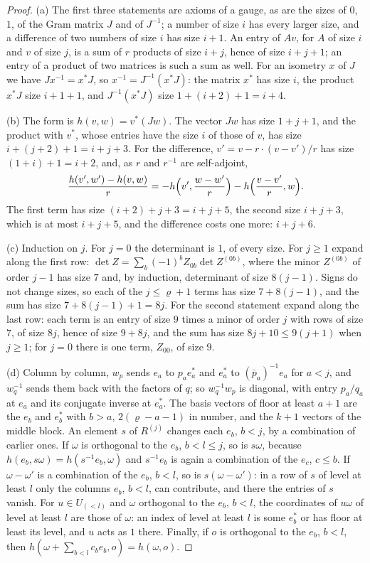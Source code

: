 \begin{proof}
(a) The first three statements are axioms of a gauge, as are the sizes of $0$, $1$, of the Gram matrix $J$ and of $J^{-1}$; a number of size $i$ has every larger size, and a difference of two numbers of size $i$ has size $i+1$. An entry of $Av$, for $A$ of
size $i$ and $v$ of size $j$, is a sum of $r$ products of size $i+j$, hence of size $i+j+1$; an entry of a product of two matrices is such a sum as well. For an isometry $x$ of $J$ we have $Jx^{-1}=x^*J$, so $x^{-1}=J^{-1}(x^*J)$: the matrix $x^*$ has size
$i$, the product $x^*J$ size $i+1+1$, and $J^{-1}(x^*J)$ size $1+(i+2)+1=i+4$.

(b) The form is $h(v,w)=v^*(Jw)$. The vector $Jw$ has size $1+j+1$, and the product with $v^*$, whose entries have the size $i$ of those of $v$, has size $i+(j+2)+1=i+j+3$. For the difference, $v'=v-r\cdot(v-v')/r$ has size $(1+i)+1=i+2$, and, as $r$ and
$r^{-1}$ are self-adjoint,
\[
  \frac{h(v',w')-h(v,w)}r=-h\Bigl(v',\frac{w-w'}r\Bigr)-h\Bigl(\frac{v-v'}r,w\Bigr).
\]
The first term has size $(i+2)+j+3=i+j+5$, the second size $i+j+3$, which is at most $i+j+5$, and the difference costs one more: $i+j+6$.

(c) Induction on $j$. For $j=0$ the determinant is $1$, of every size. For $j\ge1$ expand along the first row: $\det Z=\sum_b(-1)^bZ_{0b}\det Z^{(0b)}$, where the minor $Z^{(0b)}$ of order $j-1$ has size $7$ and, by induction, determinant of size $8(j-1)$. Signs do not
change sizes, so each of the $j\le\varrho+1$ terms has size $7+8(j-1)$, and the sum has size $7+8(j-1)+1=8j$. For the second statement expand along the last row: each term is an entry of size $9$ times a minor of order $j$ with rows of size $7$, of size $8j$,
hence of size $9+8j$, and the sum has size $8j+10\le9(j+1)$ when $j\ge1$; for $j=0$ there is one term, $Z_{00}$, of size $9$.

(d) Column by column, $w_p$ sends $e_a$ to $p_ae^*_a$ and $e^*_a$ to $(\bar p_a)^{-1}e_a$ for $a<j$, and $w_q^{-1}$ sends them back with the factors of $q$; so $w_q^{-1}w_p$ is diagonal, with entry $p_a/q_a$ at $e_a$ and its conjugate inverse at $e^*_a$.
The basis vectors of floor at least $a+1$ are the $e_b$ and $e^*_b$ with $b>a$, $2(\varrho-a-1)$ in number, and the $k+1$ vectors of the middle block. An element $s$ of $R^{(j)}$ changes each $e_b$, $b<j$, by a combination of earlier ones. If $\omega$ is orthogonal
to the $e_b$, $b<l\le j$, so is $s\omega$, because $h(e_b,s\omega)=h(s^{-1}e_b,\omega)$ and $s^{-1}e_b$ is again a combination of the $e_c$, $c\le b$. If $\omega-\omega'$ is a combination of the $e_b$, $b<l$, so is $s(\omega-\omega')$: in a row of $s$ of level at least $l$ only
the columns $e_b$, $b<l$, can contribute, and there the entries of $s$ vanish. For $u\in U_{(<l)}$ and $\omega$ orthogonal to the $e_b$, $b<l$, the coordinates of $u\omega$ of level at least $l$ are those of $\omega$: an index of level at least $l$ is some $e^*_b$ or has
floor at least its level, and $u$ acts as $1$ there. Finally, if $o$ is orthogonal to the $e_b$, $b<l$, then $h(\omega+\sum_{b<l}c_be_b,o)=h(\omega,o)$.
\end{proof}

